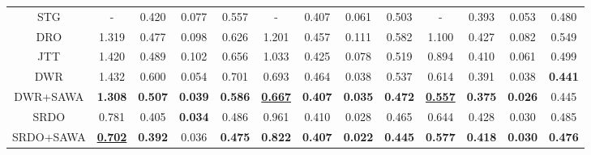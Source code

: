 \begin{table*}[!ht]
{\begin{tabular}{@{}ccccccccccccc@{}}
\multicolumn{1}{c|}{STG}       & -                    & 0.420                & 0.077                & \multicolumn{1}{c|}{0.557}                & -                    & 0.407                & 0.061                & \multicolumn{1}{c|}{0.503}                & -                    & 0.393                & 0.053                & 0.480                \\
\multicolumn{1}{c|}{DRO}       & 1.319                & 0.477                & 0.098                & \multicolumn{1}{c|}{0.626}                & 1.201                & 0.457                & 0.111                & \multicolumn{1}{c|}{0.582}                & 1.100                & 0.427                & 0.082                & 0.549                \\
\multicolumn{1}{c|}{JTT}       & 1.420                & 0.489                & 0.102                & \multicolumn{1}{c|}{0.656}                & 1.033                & 0.425                & 0.078                & \multicolumn{1}{c|}{0.519}                & 0.894                & 0.410                & 0.061                & 0.499                \\ \midrule
\multicolumn{1}{c|}{DWR}       & 1.432                & 0.600                & 0.054                & \multicolumn{1}{c|}{0.701}                & 0.693                & 0.464                & 0.038                & \multicolumn{1}{c|}{0.537}                & 0.614                & 0.391                & 0.038                & \textbf{0.441}       \\
\multicolumn{1}{c|}{DWR+SAWA}  & \textbf{1.308}       & \textbf{0.507}       & \textbf{0.039}       & \multicolumn{1}{c|}{\textbf{0.586}}       & {\ul \textbf{0.667}} & \textbf{0.407}       & \textbf{0.035}       & \multicolumn{1}{c|}{\textbf{0.472}}       & {\ul \textbf{0.557}} & \textbf{0.375}       & \textbf{0.026}       & 0.445                \\ \midrule
\multicolumn{1}{c|}{SRDO}      & 0.781                & 0.405                & \textbf{0.034}       & \multicolumn{1}{c|}{0.486}                & 0.961                & 0.410                & 0.028                & \multicolumn{1}{c|}{0.465}                & 0.644                & 0.428                & 0.030                & 0.485                \\
\multicolumn{1}{c|}{SRDO+SAWA} & {\ul \textbf{0.702}} & \textbf{0.392}       & 0.036                & \multicolumn{1}{c|}{\textbf{0.475}}       & \textbf{0.822}       & \textbf{0.407}       & \textbf{0.022}       & \multicolumn{1}{c|}{\textbf{0.445}}       & \textbf{0.577}       & \textbf{0.418}       & \textbf{0.030}       & \textbf{0.476}       \\ \midrule

\end{tabular}}
\end{table*}
